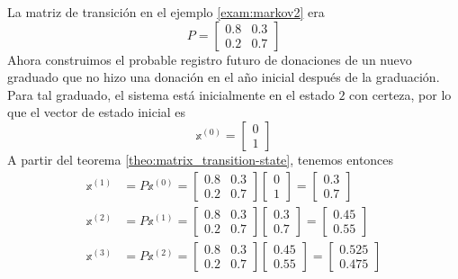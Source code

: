\begin{example}\label{exam:markov3}
    La matriz de transición en el ejemplo \ref{exam:markov2} era
    $$P = \begin{bmatrix}
        0.8 & 0.3 \\
        0.2 & 0.7
    \end{bmatrix}$$
    Ahora construimos el probable registro futuro de donaciones de un nuevo graduado que no hizo una donación en el año inicial después de la graduación. Para tal graduado, el sistema está inicialmente en el estado $2$ con certeza, por lo que el vector de estado inicial es
    $$\mathbb{x}^{(0)} = \begin{bmatrix} 0 \\ 1 \end{bmatrix}$$
    A partir del teorema \ref{theo:matrix_transition-state}, tenemos entonces
    \begin{align*}
        \mathbb{x}^{(1)} & = P\mathbb{x}^{(0)} = \begin{bmatrix} 0.8 & 0.3 \\ 0.2 & 0.7 \end{bmatrix} \begin{bmatrix} 0 \\ 1 \end{bmatrix} = \begin{bmatrix} 0.3 \\ 0.7 \end{bmatrix} \\
        \mathbb{x}^{(2)} & = P\mathbb{x}^{(1)} = \begin{bmatrix} 0.8 & 0.3 \\ 0.2 & 0.7 \end{bmatrix} \begin{bmatrix} 0.3 \\ 0.7 \end{bmatrix} = \begin{bmatrix} 0.45 \\ 0.55 \end{bmatrix} \\
        \mathbb{x}^{(3)} & = P\mathbb{x}^{(2)} = \begin{bmatrix} 0.8 & 0.3 \\ 0.2 & 0.7 \end{bmatrix} \begin{bmatrix} 0.45 \\ 0.55 \end{bmatrix} = \begin{bmatrix} 0.525 \\ 0.475 \end{bmatrix}

\end{align*}
\end{example}
